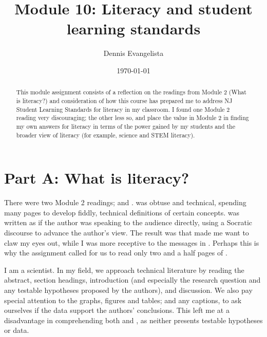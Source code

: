 \documentclass{article}
\title{Module 10: Literacy and student learning standards}
\author{Dennis Evangelista}
\date{\today}
\begin{document}
\maketitle

\begin{abstract}
This module assignment consists of a reflection on the readings from Module 2 (What is literacy?) and consideration of how this course has prepared me to address NJ Student Learning Standards for literacy in my classroom. I found one Module 2 reading very discouraging; the other less so, and place the value in Module 2 in finding my own answers for literacy in terms of the power gained by my students and the broader view of literacy (for example, science and STEM literacy). 
\end{abstract}

\section{Part A: What is literacy? }

There were two Module 2 readings; \citet{gee89} and \citet{campbell90}. \cite{gee89} was obtuse and technical, spending many pages to develop fiddly, technical definitions of certain concepts. \cite{campbell90} was written as if the author was speaking to the audience directly, using a Socratic discourse to advance the author's view. The result was that \cite{gee89} made me want to claw my eyes out, while I was more receptive to the messages in \cite{campbell90}. Perhaps this is why the assignment called for us to read only two and a half pages of \cite{gee89}. 

I am a scientist. In my field, we approach technical literature by reading the abstract, section headings, introduction (and especially the research question and any testable hypotheses proposed by the authors), and discussion. We also pay special attention to the graphs, figures and tables; and any captions, to ask ourselves if the data support the authors' conclusions. This left me at a disadvantage in comprehending both \cite{gee89} and \cite{campbell90}, as neither presents testable hypotheses or data. 
\end{document}

